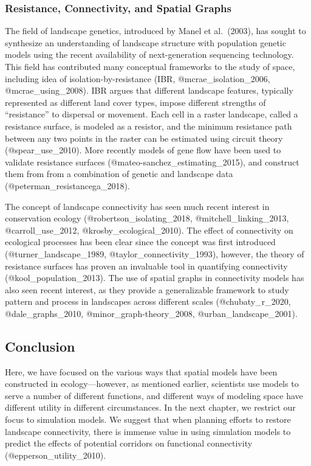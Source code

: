 \hypertarget{resistance-connectivity-and-spatial-graphs}{%
\subsubsection{Resistance, Connectivity, and Spatial
Graphs}\label{resistance-connectivity-and-spatial-graphs}}

The field of landscape genetics, introduced by Manel et al.~(2003), has
sought to synthesize an understanding of landscape structure with
population genetic models using the recent availability of
next-generation sequencing technology. This field has contributed many
conceptual frameworks to the study of space, including idea of
isolation-by-resistance (IBR, @mcrae\_isolation\_2006,
@mcrae\_using\_2008). IBR argues that different landscape features,
typically represented as different land cover types, impose different
strengths of ``resistance'' to dispersal or movement. Each cell in a
raster landscape, called a resistance surface, is modeled as a resistor,
and the minimum resistance path between any two points in the raster can
be estimated using circuit theory (@spear\_use\_2010). More recently
models of gene flow have been used to validate resistance surfaces
(@mateo-sanchez\_estimating\_2015), and construct them from from a
combination of genetic and landscape data
(@peterman\_resistancega\_2018).

The concept of landscape connectivity has seen much recent interest in
conservation ecology (@robertson\_isolating\_2018,
@mitchell\_linking\_2013, @carroll\_use\_2012,
@krosby\_ecological\_2010). The effect of connectivity on ecological
processes has been clear since the concept was first introduced
(@turner\_landscape\_1989, @taylor\_connectivity\_1993), however, the
theory of resistance surfaces has proven an invaluable tool in
quantifying connectivity (@kool\_population\_2013). The use of spatial
graphs in connectivity models has also seen recent interest, as they
provide a generalizable framework to study pattern and process in
landscapes across different scales (@chubaty\_r\_2020,
@dale\_graphs\_2010, @minor\_graph-theory\_2008,
@urban\_landscape\_2001).

\hypertarget{conclusion}{%
\subsection{Conclusion}\label{conclusion}}

Here, we have focused on the various ways that spatial models have been
constructed in ecology---however, as mentioned earlier, scientists use
models to serve a number of different functions, and different ways of
modeling space have different utility in different circumstances. In the
next chapter, we restrict our focus to simulation models. We suggest
that when planning efforts to restore landscape connectivity, there is
immense value in using simulation models to predict the effects of
potential corridors on functional connectivity
(@epperson\_utility\_2010).

\pagebreak
